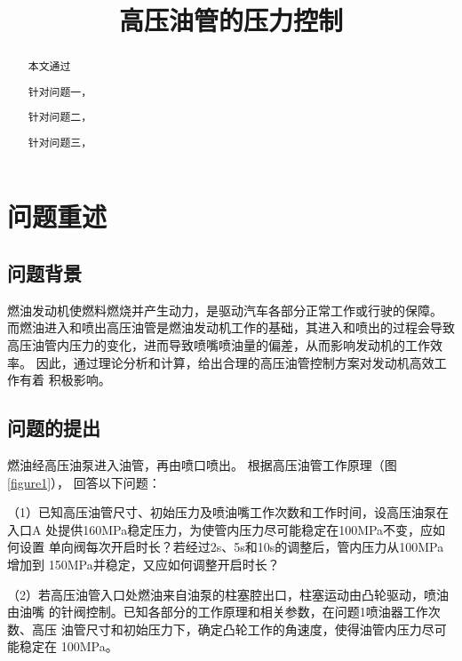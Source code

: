 \documentclass[withoutpreface,bwprint]{cumcmthesis} %
\title{高压油管的压力控制}
\begin{document}
\maketitle
\begin{abstract}
        本文通过

        针对问题一，
        
        针对问题二，
        
        针对问题三，
        
        
\end{abstract}



\section{问题重述}
\subsection{问题背景}
        燃油发动机使燃料燃烧并产生动力，是驱动汽车各部分正常工作或行驶的保障。                      
    而燃油进入和喷出高压油管是燃油发动机工作的基础，其进入和喷出的过程会导致
    高压油管内压力的变化，进而导致喷嘴喷油量的偏差，从而影响发动机的工作效率。
    因此，通过理论分析和计算，给出合理的高压油管控制方案对发动机高效工作有着
    积极影响。

\subsection{问题的提出}
        燃油经高压油泵进入油管，再由喷口喷出。
    根据高压油管工作原理（图\ref{figure1}），
    回答以下问题：

（1）已知高压油管尺寸、初始压力及喷油嘴工作次数和工作时间，设高压油泵在入口A
    处提供160MPa稳定压力，为使管内压力尽可能稳定在100MPa不变，应如何设置
    单向阀每次开启时长？若经过2s、5s和10s的调整后，管内压力从100MPa增加到
    150MPa并稳定，又应如何调整开启时长？

（2）若高压油管入口处燃油来自油泵的柱塞腔出口，柱塞运动由凸轮驱动，喷油由油嘴
    的针阀控制。已知各部分的工作原理和相关参数，在问题1喷油器工作次数、高压
    油管尺寸和初始压力下，确定凸轮工作的角速度，使得油管内压力尽可能稳定在
    100MPa。
\end{document}
